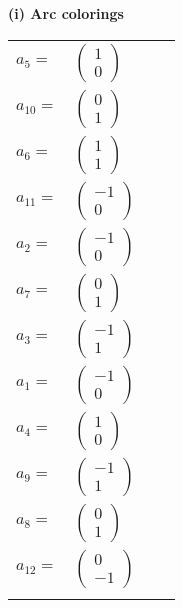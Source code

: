 \documentclass[1p]{elsarticle_modified}
\theoremstyle{definition}
\begin{document}
\flushleft \textbf{(i) Arc colorings}\\
\begin{tabular}{m{7pt} m{180pt} m{7pt} m{180pt} }
\flushright $a_{5}=$&$\begin{pmatrix}1\\0\end{pmatrix}$ \\
\flushright $a_{10}=$&$\begin{pmatrix}0\\1\end{pmatrix}$ \\
\flushright $a_{6}=$&$\begin{pmatrix}1\\1\end{pmatrix}$ \\
\flushright $a_{11}=$&$\begin{pmatrix}-1\\0\end{pmatrix}$ \\
\flushright $a_{2}=$&$\begin{pmatrix}-1\\0\end{pmatrix}$ \\
\flushright $a_{7}=$&$\begin{pmatrix}0\\1\end{pmatrix}$ \\
\flushright $a_{3}=$&$\begin{pmatrix}-1\\1\end{pmatrix}$ \\
\flushright $a_{1}=$&$\begin{pmatrix}-1\\0\end{pmatrix}$ \\
\flushright $a_{4}=$&$\begin{pmatrix}1\\0\end{pmatrix}$ \\
\flushright $a_{9}=$&$\begin{pmatrix}-1\\1\end{pmatrix}$ \\
\flushright $a_{8}=$&$\begin{pmatrix}0\\1\end{pmatrix}$ \\
\flushright $a_{12}=$&$\begin{pmatrix}0\\-1\end{pmatrix}$\\&\end{tabular}
\end{document}
